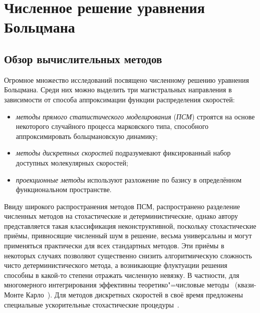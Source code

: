 \chapter{Численное решение уравнения Больцмана} \label{chapt:numerics}

\section{Обзор вычислительных методов} \label{sect:review}

Огромное множество исследований посвящено численному решению уравнения Больцмана.
Среди них можно выделить три магистральных направления в зависимости от способа аппроксимации
функции распределения скоростей:
\begin{itemize}
    \item \emph{методы прямого статистического моделирования} (\emph{ПСМ})
    строятся на основе некоторого случайного процесса марковского типа,
    способного аппроксимировать больцмановскую динамику;
    \item \emph{методы дискретных скоростей} подразумевают фиксированный набор доступных молекулярных скоростей;
    \item \emph{проекционные методы} используют разложение по базису в определённом функциональном пространстве.
\end{itemize}
Ввиду широкого распространения методов ПСМ, распространено разделение численных методов
на стохастические и детерминистические, однако автору представляется такая классификация неконструктивной,
поскольку стохастические приёмы, привносящие численный шум в решение, весьма универсальны
и могут применяться практически для всех стандартных методов.
Эти приёмы в некоторых случаях позволяют существенно снизить алгоритмическую сложность чисто детерминистического метода,
а возникающие флуктуации решения способны в какой-то степени отражать численную невязку.
В частности, для многомерного интегрирования эффективны теоретико"=числовые методы~\cite{Korobov1963}
(квази-Монте Карло~\cite{Dick2013}).
Для методов дискретных скоростей в своё время предложены специальные ускорительные стохастические
процедуры~\cite{Buet1996, Platkowski2000}.

